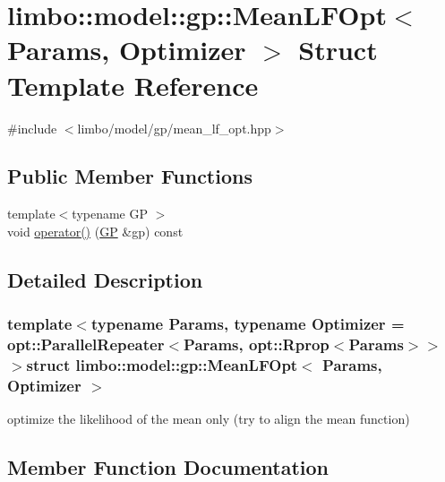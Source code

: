 \hypertarget{structlimbo_1_1model_1_1gp_1_1_mean_l_f_opt}{}\section{limbo\+:\+:model\+:\+:gp\+:\+:Mean\+L\+F\+Opt$<$ Params, Optimizer $>$ Struct Template Reference}
\label{structlimbo_1_1model_1_1gp_1_1_mean_l_f_opt}


{\ttfamily \#include $<$limbo/model/gp/mean\+\_\+lf\+\_\+opt.\+hpp$>$}

\subsection*{Public Member Functions}
\begin{DoxyCompactItemize}
\item 
{\footnotesize template$<$typename G\+P $>$ }\\void \hyperlink{structlimbo_1_1model_1_1gp_1_1_mean_l_f_opt_a5aa3594a4e34320abe306676b0af6039}{operator()} (\hyperlink{classlimbo_1_1model_1_1_g_p}{G\+P} \&gp) const 
\end{DoxyCompactItemize}


\subsection{Detailed Description}
\subsubsection*{template$<$typename Params, typename Optimizer = opt\+::\+Parallel\+Repeater$<$\+Params, opt\+::\+Rprop$<$\+Params$>$$>$$>$struct limbo\+::model\+::gp\+::\+Mean\+L\+F\+Opt$<$ Params, Optimizer $>$}

optimize the likelihood of the mean only (try to align the mean function) 

\subsection{Member Function Documentation}
\hypertarget{structlimbo_1_1model_1_1gp_1_1_mean_l_f_opt_a5aa3594a4e34320abe306676b0af6039}{}
